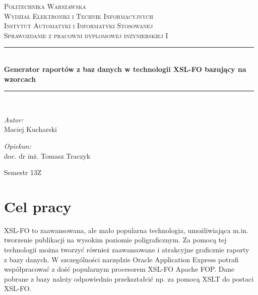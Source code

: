 \documentclass[11pt,a4paper]{article}
\newcommand{\HRule}{\rule{\linewidth}{0.5mm}}
\begin{document}
\begin{titlepage}
\begin{center}
\textsc{\LARGE Politechnika Warszawska}\\[0.5cm]
\textsc{\Large Wydział Elektroniki i Technik Informacyjnych}\\
\textsc{\Large Instytut Automatyki i Informatyki Stosowanej}\\[1.5cm]

\textsc{\Large Sprawozdanie z pracowni dyplomowej inżynierskiej I} \\[0.5cm]
\HRule \\[0.4cm]
{ \huge \bfseries Generator raportów z baz danych w technologii XSL-FO  bazujący na wzorcach \\[0.4cm]}
\HRule \\[1.5cm]

\begin{minipage} {0.4\textwidth}
\begin{flushleft} \large
\emph{Autor:}\\
 Maciej Kucharski 
\end{flushleft}
\end{minipage}
\begin{minipage} {0.4\textwidth}
\begin{flushright} \large

\emph{Opiekun:}\\
doc. dr inż. Tomasz Traczyk

\end{flushright}
\end{minipage}	
\vfill
\large Semestr 13Z

	\end{center}
\end{titlepage}
 
\tableofcontents
\newpage

\section{Cel pracy} \label{sec:cel}
XSL-FO to zaawansowana, ale mało popularna technologia, umożliwiająca m.in. tworzenie publikacji na wysokim poziomie poligraficznym. Za pomocą tej technologii można tworzyć również zaawansowane i atrakcyjne graficznie raporty z bazy danych. W szczególności narzędzie Oracle Application Express potrafi współpracować z dość popularnym procesorem XSL-FO Apache FOP. Dane pobrane z bazy należy odpowiednio przekształcić np. za pomocą XSLT do postaci XSL-FO.
\end{document}
